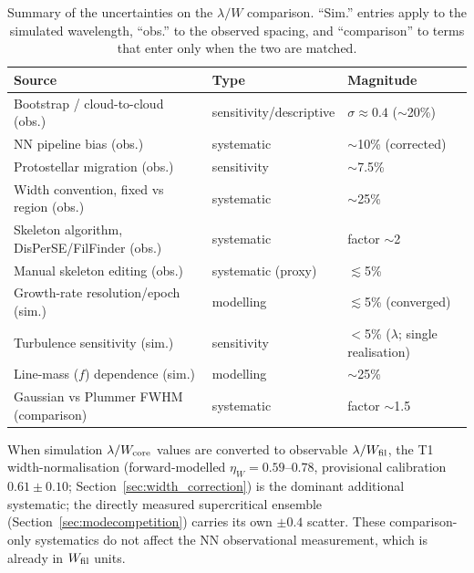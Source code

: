 \documentclass[usenatbib,twoside,twocolumn]{mnras}
\begin{document}
\begin{table}
\caption{Summary of the uncertainties on the $\lambda/W$ comparison. ``Sim.'' entries apply to the simulated wavelength, ``obs.'' to the observed spacing, and ``comparison'' to terms that enter only when the two are matched.}
\label{tab:errorbudget}
\footnotesize
\setlength{\tabcolsep}{3pt}
\begin{tabular}{p{3.6cm}p{1.9cm}p{1.7cm}}
\toprule
Source & Type & Magnitude \\
\midrule
Bootstrap / cloud-to-cloud (obs.) & sensitivity/descriptive & $\sigma\approx0.4$ ($\sim$20\%) \\
NN pipeline bias (obs.) & systematic & $\sim$10\% (corrected) \\
Protostellar migration (obs.) & sensitivity & $\sim$7.5\% \\
Width convention, fixed vs region (obs.) & systematic & $\sim$25\% \\
Skeleton algorithm, DisPerSE/FilFinder (obs.) & systematic & factor $\sim$2 \\
Manual skeleton editing (obs.) & systematic (proxy) & $\lesssim$5\% \\
Growth-rate resolution/epoch (sim.) & modelling & $\lesssim$5\% (converged) \\
Turbulence sensitivity (sim.) & sensitivity & $<$5\% ($\lambda$; single realisation) \\
Line-mass ($f$) dependence (sim.) & modelling & $\sim$25\% \\
Gaussian vs Plummer FWHM (comparison) & systematic & factor $\sim$1.5 \\
\bottomrule
\end{tabular}
\end{table}

When simulation $\lambda/W_{\rm core}$ values are converted to observable $\lambda/W_{\rm fil}$, the T1 width-normalisation (forward-modelled $\eta_W=0.59$--$0.78$, provisional calibration $0.61\pm0.10$; Section~\ref{sec:width_correction}) is the dominant additional systematic; the directly measured supercritical ensemble (Section~\ref{sec:modecompetition}) carries its own $\pm0.4$ scatter. These comparison-only systematics do not affect the NN observational measurement, which is already in $W_{\rm fil}$ units.
\end{document}
